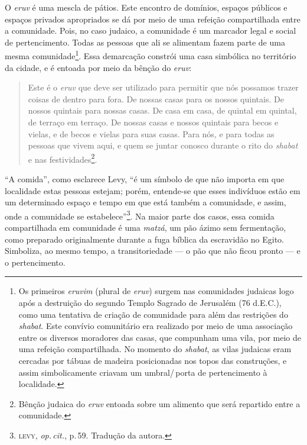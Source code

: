 O \emph{eruv} é uma mescla de pátios. Este encontro de domínios, espaços
públicos e espaços privados apropriados se dá por meio de uma refeição
compartilhada entre a comunidade. Pois, no caso judaico, a comunidade é
um marcador legal e social de pertencimento. Todas as pessoas que ali se
alimentam fazem parte de uma mesma comunidade\footnote{Os primeiros
  \emph{eruvim} (plural de \emph{eruv}) surgem nas comunidades judaicas
  logo após a destruição do segundo Templo Sagrado de Jerusalém (76
  d.E.C.), como uma tentativa de criação de comunidade para além das
  restrições do \emph{shabat}. Este convívio comunitário era realizado
  por meio de uma associação entre os diversos moradores das casas, que
  compunham uma vila, por meio de uma refeição compartilhada. No momento
  do \emph{shabat}, as vilas judaicas eram cercadas por tábuas de
  madeira posicionadas nos topos das construções, e assim simbolicamente
  criavam um umbral/\,porta de pertencimento à localidade.}. Essa
demarcação constrói uma casa simbólica no território da cidade, e é
entoada por meio da bênção do \emph{eruv}:

\begin{quote}
Este é o \emph{eruv} que deve ser utilizado para permitir que nós possamos
trazer coisas de dentro para fora. De nossas casas para os nossos
quintais. De nossos quintais para nossas casas. De casa em casa, de
quintal em quintal, de terraço em terraço. De nossas casas e nossos
quintais para becos e vielas, e de becos e vielas para suas casas. Para
nós, e para todas as pessoas que vivem aqui, e quem se juntar conosco
durante o rito do \emph{shabat} e nas festividades\footnote{Bênção judaica do
  \emph{eruv} entoada sobre um alimento que será repartido entre a
  comunidade.}.
\end{quote}

``A comida'', como esclarece Levy, ``é um símbolo de que
não importa em que localidade estas pessoas estejam; porém, entende-se
que esses indivíduos estão em um determinado espaço e tempo em que está
também a comunidade, e assim, onde a comunidade se
estabelece''\footnote{\textsc{levy}, \emph{op.\,cit.}, p.\,59. Tradução da autora.}. Na
maior parte dos casos, essa comida compartilhada em comunidade é uma
\emph{matzá}, um pão ázimo sem fermentação, como preparado originalmente
durante a fuga bíblica da escravidão no Egito. Simboliza, ao mesmo
tempo, a transitoriedade --- o pão que não ficou pronto --- e o
pertencimento.

